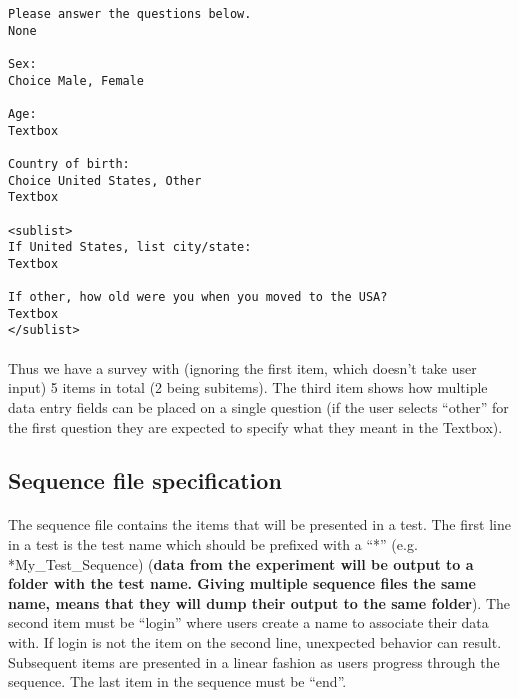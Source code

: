 \begin{tcolorbox}[colback=white,colframe=blue,width=\dimexpr\textwidth+12mm\relax,enlarge left by=-6mm,enlarge right by=6mm]

\begin{lstlisting}
Please answer the questions below.
None

Sex: 
Choice Male, Female

Age:
Textbox

Country of birth:
Choice United States, Other
Textbox

<sublist>
If United States, list city/state:
Textbox

If other, how old were you when you moved to the USA?
Textbox
</sublist>

\end{lstlisting}

\end{tcolorbox}

\paragraph{}
Thus we have a survey with (ignoring the first item, which doesn't take user input) 5 items in total (2 being subitems).  The third item shows how multiple data entry fields can be placed on a single question (if the user selects ``other'' for the first question they are expected to specify what they meant in the Textbox).

\subsection{Sequence file specification}
\label{sec:sequenceSpec}

\paragraph{}
The sequence file contains the items that will be presented in a test.  The first line in a test is the test name which should be prefixed with a ``*'' (e.g. *My\_Test\_Sequence) (\textbf{data from the experiment will be output to a folder with the test name.  Giving multiple sequence files the same name, means that they will dump their output to the same folder}).  The second item must be ``login'' where users create a name to associate their data with.  If login is not the item on the second line, unexpected behavior can result.
Subsequent items are presented in a linear fashion as users progress through the sequence.  The last item in the sequence must be ``end''.

